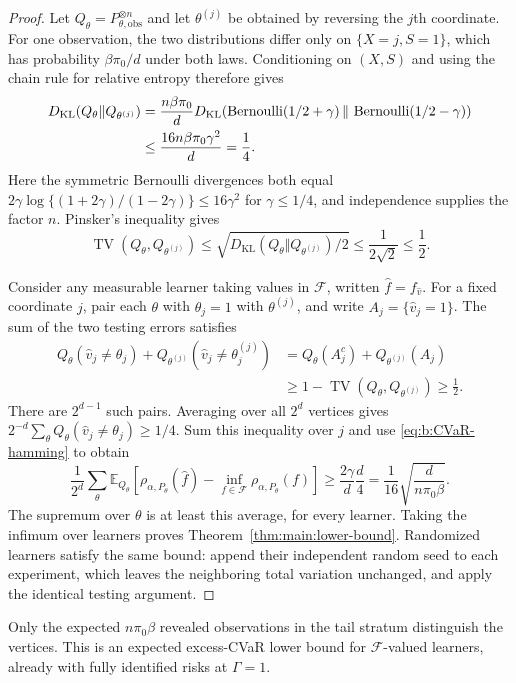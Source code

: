 \begin{proof}
Let $Q_\theta=P_{\theta,\mathrm{obs}}^{\otimes n}$ and let
$\theta^{(j)}$ be obtained by reversing the $j$th coordinate.
For one observation, the two distributions differ only on
$\{X=j,S=1\}$, which has probability $\beta\pi_0/d$ under both laws.
Conditioning on $(X,S)$ and using the chain rule for relative entropy
therefore gives
\begin{align}
 D_{\mathrm{KL}}(Q_\theta\Vert Q_{\theta^{(j)}})
 &=\frac{n\beta\pi_0}{d}
 D_{\mathrm{KL}}\!\left(
 \operatorname{Bernoulli}(1/2+\gamma)
 \,\Vert\,\operatorname{Bernoulli}(1/2-\gamma)\right)\notag\\
 &\leq\frac{16n\beta\pi_0\gamma^2}{d}=\frac14.
 \label{eq:b:KL}
\end{align}
Here the symmetric Bernoulli divergences both equal
$2\gamma\log\{(1+2\gamma)/(1-2\gamma)\}\leq16\gamma^2$ for
$\gamma\leq1/4$, and independence supplies the factor $n$.
Pinsker's inequality gives
\begin{equation}
 \operatorname{TV}(Q_\theta,Q_{\theta^{(j)}})
 \leq\sqrt{D_{\mathrm{KL}}(Q_\theta\Vert Q_{\theta^{(j)}})/2}
 \leq\frac1{2\sqrt2}\leq\frac12.
 \label{eq:b:TV}
\end{equation}

Consider any measurable learner taking values in $\mathcal F$,
written $\widehat f=f_{\widehat v}$. For a fixed coordinate $j$, pair
each $\theta$ with $\theta_j=1$ with $\theta^{(j)}$, and write
$A_j=\{\widehat v_j=1\}$. The sum of the two testing errors satisfies
\begin{align*}
 Q_\theta(\widehat v_j\ne\theta_j)
 +Q_{\theta^{(j)}}(\widehat v_j\ne\theta_j^{(j)})
 &=Q_\theta(A_j^c)+Q_{\theta^{(j)}}(A_j)\\
 &\geq1-\operatorname{TV}(Q_\theta,Q_{\theta^{(j)}})\geq\frac12.
\end{align*}
There are $2^{d-1}$ such pairs. Averaging over all $2^d$ vertices gives
$2^{-d}\sum_\theta Q_\theta(\widehat v_j\ne\theta_j)\geq1/4$.
Sum this inequality over $j$ and use \eqref{eq:b:CVaR-hamming} to obtain
\[
 \frac1{2^d}\sum_\theta
 \mathbb E_{Q_\theta}\left[
 \rho_{\alpha,P_\theta}(\widehat f)-
 \inf_{f\in\mathcal F}\rho_{\alpha,P_\theta}(f)\right]
 \geq\frac{2\gamma}{d}\frac d4
 =\frac1{16}\sqrt{\frac{d}{n\pi_0\beta}}.
\]
The supremum over $\theta$ is at least this average, for every learner.
Taking the infimum over learners proves Theorem~\ref{thm:main:lower-bound}.
Randomized learners satisfy the same bound: append their independent
random seed to each experiment, which leaves the neighboring total
variation unchanged, and apply the identical testing argument.
\end{proof}

Only the expected $n\pi_0\beta$ revealed observations in the tail stratum
distinguish the vertices. This is an expected excess-CVaR lower bound for
$\mathcal F$-valued learners, already with fully identified risks at $\Gamma=1$.


